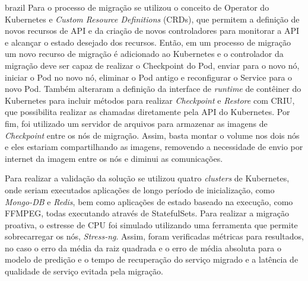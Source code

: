 \begin{otherlanguage*}{brazil}
Para o processo de migração se utilizou o conceito de Operator do Kubernetes
e \textit{Custom Resource Definitions} (CRDs), que permitem a definição de
novos recursos de API e da criação de novos controladores para monitorar a
API e alcançar o estado desejado dos recursos. Então, em um processo de
migração um novo recurso de migração é adicionado ao Kubernetes e o
controlador da migração deve ser capaz de realizar o Checkpoint do Pod, enviar
para o novo nó, iniciar o Pod no novo nó, eliminar o Pod antigo e reconfigurar
o Service para o novo Pod. Também alteraram a definição da interface de
\textit{runtime} de contêiner do Kubernetes para incluir métodos para realizar
\textit{Checkpoint} e \textit{Restore} com CRIU, que possibilita realizar
as chamadas diretamente pela API do Kubernetes. Por fim, foi utilizado um servidor
de arquivos para armazenar as imagens de \textit{Checkpoint} entre os nós de
migração. Assim, basta montar o volume nos dois nós e eles estariam
compartilhando as imagens, removendo a necessidade de envio
por internet da imagem entre os nós e diminui as comunicações.

Para realizar a validação da solução se utilizou quatro \textit{clusters} de
Kubernetes, onde seriam executados aplicações de longo período de inicialização,
como \textit{Mongo-DB} e \textit{Redis}, bem como aplicações de estado baseado na
execução, como FFMPEG, todas executando através de StatefulSets. Para realizar a
migração proativa, o estresse de CPU foi simulado utilizando uma ferramenta que
permite sobrecarregar os nós, \textit{Stress-ng}. Assim, foram verificadas métricas
para resultados, no caso o erro da média da raiz quadrada e o erro de média absoluta
para o modelo de predição e o tempo de recuperação do serviço migrado e a latência
de qualidade de serviço evitada pela migração.


\end{otherlanguage*}
